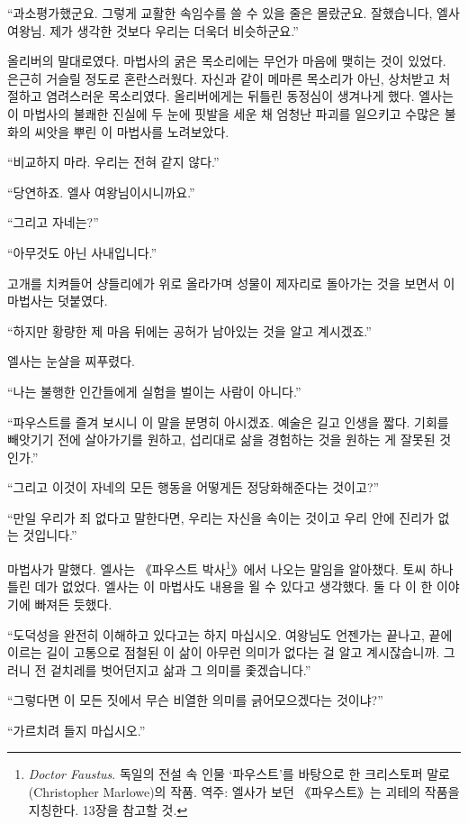 ``과소평가했군요. 그렇게 교활한 속임수를 쓸 수 있을 줄은 몰랐군요. 잘했습니다, 엘사 여왕님. 제가 생각한 것보다 우리는 더욱더 비슷하군요.''

올리버의 말대로였다. 마법사의 굵은 목소리에는 무언가 마음에 맺히는 것이 있었다. 은근히 거슬릴 정도로 혼란스러웠다. 자신과 같이 메마른 목소리가 아닌, 상처받고 처절하고 염려스러운 목소리였다. 올리버에게는 뒤틀린 동정심이 생겨나게 했다. 엘사는 이 마법사의 불쾌한 진실에 두 눈에 핏발을 세운 채 엄청난 파괴를 일으키고 수많은 불화의 씨앗을 뿌린 이 마법사를 노려보았다.

``비교하지 마라. 우리는 전혀 같지 않다.''

``당연하죠. 엘사 여왕님이시니까요.''

``그리고 자네는?''

``아무것도 아닌 사내입니다.''

고개를 치켜들어 샹들리에가 위로 올라가며 성물이 제자리로 돌아가는 것을 보면서 이 마법사는 덧붙였다.

``하지만 황량한 제 마음 뒤에는 공허가 남아있는 것을 알고 계시겠죠.''

엘사는 눈살을 찌푸렸다.

``나는 불행한 인간들에게 실험을 벌이는 사람이 아니다.''

``파우스트를 즐겨 보시니 이 말을 분명히 아시겠죠. 예술은 길고 인생을 짧다. 기회를 빼앗기기 전에 살아가기를 원하고, 섭리대로 삶을 경험하는 것을 원하는 게 잘못된 것인가.''

``그리고 이것이 자네의 모든 행동을 어떻게든 정당화해준다는 것이고?''

``만일 우리가 죄 없다고 말한다면, 우리는 자신을 속이는 것이고 우리 안에 진리가 없는 것입니다.''

마법사가 말했다. 엘사는 《파우스트 박사\footnote{\textit{Doctor Faustus}. 독일의 전설 속 인물 `파우스트'를 바탕으로 한 크리스토퍼 말로(Christopher Marlowe)의 작품. 역주: 엘사가 보던 《파우스트》는 괴테의 작품을 지칭한다. 13장을 참고할 것.}》에서 나오는 말임을 알아챘다. 토씨 하나 틀린 데가 없었다. 엘사는 이 마법사도 내용을 욀 수 있다고 생각했다. 둘 다 이 한 이야기에 빠져든 듯했다. 

``도덕성을 완전히 이해하고 있다고는 하지 마십시오. 여왕님도 언젠가는 끝나고, 끝에 이르는 길이 고통으로 점철된 이 삶이 아무런 의미가 없다는 걸 알고 계시잖습니까. 그러니 전 겉치레를 벗어던지고 삶과 그 의미를 좇겠습니다.''

``그렇다면 이 모든 짓에서 무슨 비열한 의미를 긁어모으겠다는 것이냐?''

`` 가르치려 들지 마십시오.''

